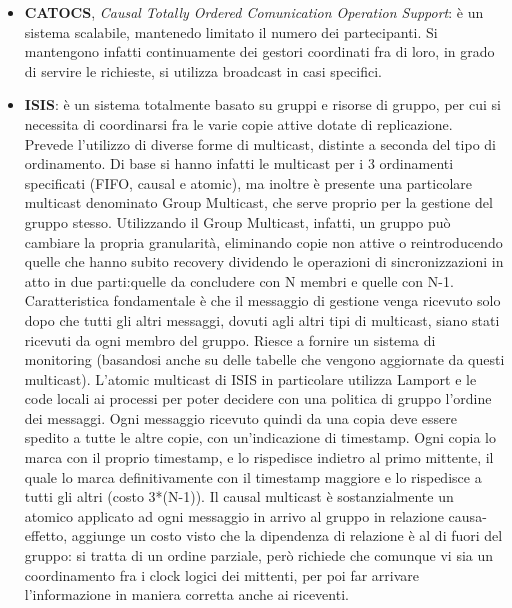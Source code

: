 \begin{itemize}
 \item \textbf{CATOCS}, \textit{Causal Totally Ordered Comunication Operation Support}: è un sistema scalabile,
 mantenedo limitato il numero dei partecipanti. Si mantengono infatti continuamente dei gestori coordinati fra di loro, in grado di servire le richieste, si utilizza broadcast in casi specifici.
 \item \textbf{ISIS}: è un sistema totalmente basato su gruppi e risorse di gruppo, per cui si necessita di coordinarsi
 fra le varie copie attive dotate di replicazione.
 Prevede l'utilizzo di diverse forme di multicast, distinte a seconda del tipo di ordinamento. Di base si hanno
 infatti le multicast per i 3 ordinamenti specificati (FIFO, causal e atomic), ma inoltre è presente una particolare
 multicast denominato Group Multicast, che serve proprio per la gestione del gruppo stesso. Utilizzando il Group Multicast, infatti, un gruppo può cambiare la propria granularità, eliminando copie non attive o reintroducendo quelle che hanno subito recovery dividendo le operazioni di sincronizzazioni in atto in due parti:quelle da concludere con N membri e quelle con N-1.
 Caratteristica fondamentale è che il messaggio di gestione venga ricevuto solo dopo che tutti gli altri messaggi,
 dovuti agli altri tipi di multicast, siano stati ricevuti da ogni membro del gruppo. Riesce a fornire un sistema di
 monitoring (basandosi anche su delle tabelle che vengono aggiornate da questi multicast).
 L'atomic multicast di ISIS in particolare utilizza Lamport e le code locali ai processi per poter decidere con una
 politica di gruppo l'ordine dei messaggi. Ogni messaggio ricevuto quindi da una copia deve essere spedito a
 tutte le altre copie, con un'indicazione di timestamp. Ogni copia lo marca con il proprio timestamp, e lo rispedisce
 indietro al primo mittente, il quale lo marca definitivamente con il timestamp maggiore e lo rispedisce a tutti gli
 altri (costo 3*(N-1)).
 Il causal multicast è sostanzialmente un atomico applicato ad ogni messaggio in arrivo al gruppo in relazione causa-effetto, aggiunge un costo visto che la dipendenza di relazione è al di fuori del gruppo: si tratta di un
 ordine parziale, però richiede che comunque vi sia un coordinamento fra i clock logici dei mittenti, per poi
 far arrivare l'informazione in maniera corretta anche ai riceventi.
\end{itemize}
